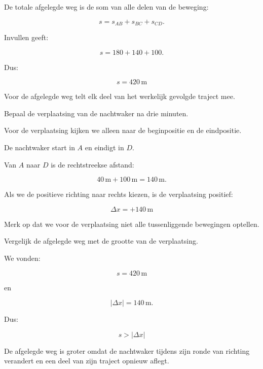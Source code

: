 \documentclass{ximera}
\begin{document}
\begin{oefening}{\oefU\ESS}
\begin{question}
  \begin{oplossing}
  De totale afgelegde weg is de som van alle delen van de beweging:
  
  \[
  s
  =
  s_{AB}+s_{BC}+s_{CD}.
  \]
  
  Invullen geeft:
  
  \[
  s
  =
  180+140+100.
  \]
  
  Dus:
  
  \[
  \boxed{s=420\,\mathrm{m}}
  \]
  
  Voor de afgelegde weg telt elk deel van het werkelijk gevolgde traject mee.
  \end{oplossing}
  \end{question}
  
  
  \begin{question}
  Bepaal de verplaatsing van de nachtwaker na drie minuten.
  
  \begin{oplossing}
  Voor de verplaatsing kijken we alleen naar de beginpositie en de eindpositie.
  
  De nachtwaker start in $A$ en eindigt in $D$.
  
  Van $A$ naar $D$ is de rechtstreekse afstand:
  
  \[
  40\,\mathrm{m}+100\,\mathrm{m}
  =
  140\,\mathrm{m}.
  \]
  
  Als we de positieve richting naar rechts kiezen, is de verplaatsing positief:
  
  \[
  \boxed{\Delta x=+140\,\mathrm{m}}
  \]
  
  Merk op dat we voor de verplaatsing niet alle tussenliggende bewegingen
  optellen.
  \end{oplossing}
  \end{question}
  
  
  \begin{question}
  Vergelijk de afgelegde weg met de grootte van de verplaatsing.
  
  \begin{oplossing}
  We vonden:
  
  \[
  s=420\,\mathrm{m}
  \]
  
  en
  
  \[
  |\Delta x|=140\,\mathrm{m}.
  \]
  
  Dus:
  
  \[
  \boxed{s>|\Delta x|}
  \]
  
  De afgelegde weg is groter omdat de nachtwaker tijdens zijn ronde van richting
  verandert en een deel van zijn traject opnieuw aflegt.
  \end{oplossing}
  \end{question}
  
  \end{oefening}
\end{document}
